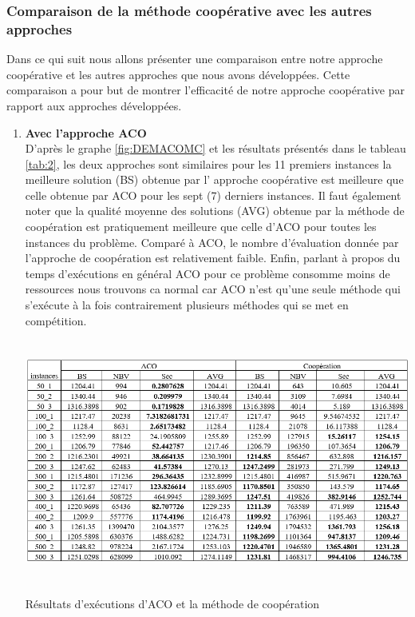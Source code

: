 \subsubsection{Comparaison de la méthode coopérative avec les autres approches}
Dans ce qui suit nous allons présenter une comparaison entre notre approche coopérative et les autres approches que nous avons développées. Cette comparaison a pour but de montrer l’efficacité de notre approche coopérative par rapport aux approches développées.

\begin{enumerate}[label=\alph*)]
	\item \textbf{Avec l’approche ACO}\\
	D’après le graphe \ref{fig:DEMACOMC} et les résultats présentés dans le tableau \ref{tab:2}, les deux approches sont similaires pour les 11 premiers instances la meilleure solution (BS) obtenue par l’ approche coopérative  est meilleure que celle obtenue par ACO pour les sept  (7) derniers instances. Il faut également noter que la qualité moyenne des solutions (AVG) obtenue par la méthode de coopération est pratiquement meilleure que celle d’ACO pour toutes les instances du problème. Comparé à ACO, le nombre d’évaluation donnée par  l’approche de coopération est relativement faible. Enfin, parlant à propos du temps d’exécutions en général ACO pour ce problème consomme moins de ressources nous trouvons ca normal car ACO n’est  qu’une seule méthode qui s’exécute à la fois contrairement plusieurs méthodes qui se met en compétition.

\begin{table}[H]
	\includegraphics[width=15cm,height=8cm]{Chap5/t2.png}
	\caption{Résultats d’exécutions d’ACO et la méthode de coopération}
	\label{tab:2}
\end{table}


\end{enumerate}
